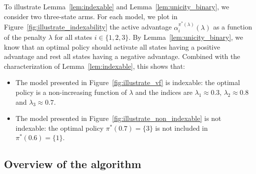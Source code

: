 To illustrate Lemma~\ref{lem:indexable} and Lemma~\ref{lem:unicity_binary}, we consider two three-state arms. For each model, we plot in Figure~\ref{fig:illustrate_indexability} the active advantage $\alpha^{\pi^*(\lambda)}_i(\lambda)$ as a function of the penalty $\lambda$ for all states $i\in\{1,2,3\}$.  By Lemma~\ref{lem:unicity_binary}, we know that an optimal policy should activate all states having a positive advantage and rest all states having a negative advantage. Combined with the characterization of Lemma~\ref{lem:indexable}, this shows that:
\begin{itemize}
    \item The model presented in Figure~\ref{fig:illustrate_vf} is indexable: the optimal policy is a non-increasing function of $\lambda$ and the indices are $\lambda_1\approx0.3$, $\lambda_2\approx0.8$ and $\lambda_3\approx0.7$.
    \item The model presented in Figure~\ref{fig:illustrate_non_indexable} is not indexable: the optimal policy $\pi^*(0.7)=\{3\}$ is not included in $\pi^*(0.6)=\{1\}$. 
\end{itemize}

\subsection{Overview of the algorithm}
\label{ssec:informal_widx_algo}

